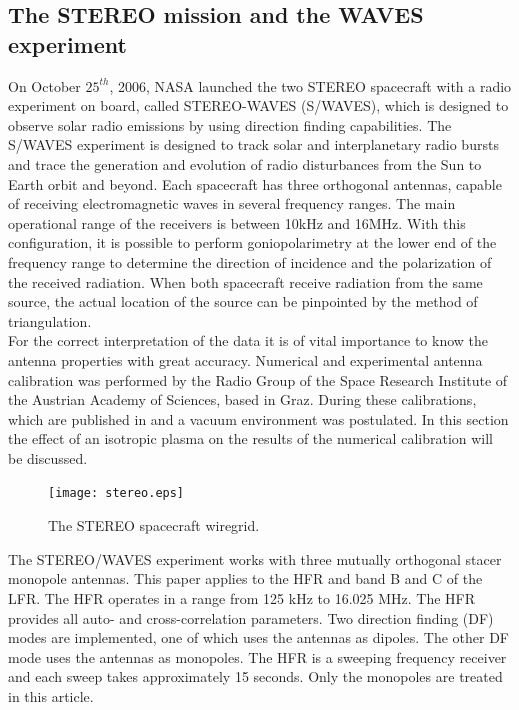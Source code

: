 \documentclass[two-coloumn,ras]{agutex}
\begin{document}
\begin{article}
\subsection{The STEREO mission and the WAVES experiment}
On October $25^{th}$, 2006, NASA launched the two STEREO spacecraft with a radio experiment on board, called STEREO-WAVES (S/WAVES), which is designed to observe solar radio emissions by using direction finding capabilities. The S/WAVES experiment is designed to track solar and interplanetary radio bursts and trace the generation and evolution of radio disturbances from the Sun to Earth orbit and beyond. Each spacecraft has three orthogonal antennas, capable of receiving electromagnetic waves in several frequency ranges. The main operational range of the receivers is between 10kHz and 16MHz. With this configuration, it is possible to perform goniopolarimetry at the lower end of the frequency range to determine the direction of incidence and the polarization of the received radiation. When both spacecraft receive radiation from the same source, the actual location of the source can be pinpointed by the method of triangulation.\\

For the correct interpretation of the data it is of vital importance to know the antenna properties with great accuracy. Numerical and experimental antenna calibration was performed by the Radio Group of the Space Research Institute of the Austrian Academy of Sciences, based in Graz. During these calibrations, which are published in \cite{ossi09} and \cite{macher07} a vacuum environment was postulated. In this section the effect of an isotropic plasma on the results of the numerical calibration will be discussed.\\

\begin{figure}
\noindent\texttt{[image: stereo.eps]}
  \caption{The STEREO spacecraft wiregrid.}\label{fig:stereo}
\end{figure}

The STEREO/WAVES experiment works with three mutually orthogonal stacer
monopole antennas. This paper applies to the HFR and band B and C of the LFR. The HFR operates in a range from 125 kHz to 16.025 MHz. The HFR provides all auto- and cross-correlation parameters. Two direction finding (DF) modes are implemented, one of which uses the antennas as dipoles. The other DF mode uses the antennas as monopoles. The HFR is a sweeping frequency receiver and each sweep takes approximately 15 seconds. Only the monopoles are treated in this article.\\


\end{article}
\end{document}
